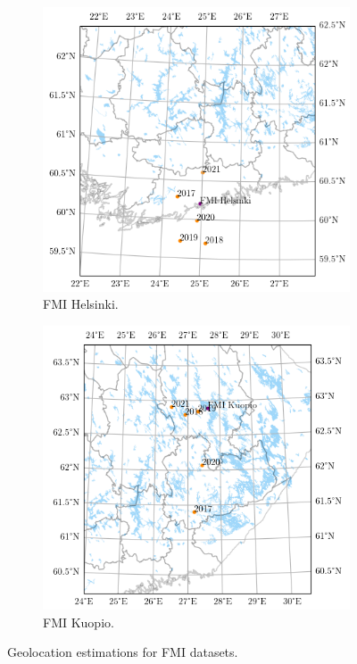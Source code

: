 \begin{figure}[h]
	
     \centering
     \begin{subfigure}[b]{0.45\textwidth}
         \centering
         \includegraphics[width=\textwidth]{pics/geolocationmap2}
         \caption{FMI Helsinki.}
         \label{fig_geolocationhelsinki}
     \end{subfigure}
     \hfill
     \begin{subfigure}[b]{0.45\textwidth}
         \centering
         \includegraphics[width=\textwidth]{pics/geolocationmap3}
         \caption{FMI Kuopio.}
         
         \label{fig_geolocationkuopio}
     \end{subfigure}
     \hfill
     \caption{Geolocation estimations for FMI datasets.}
     \label{fig_geolocationmap}
\end{figure}

